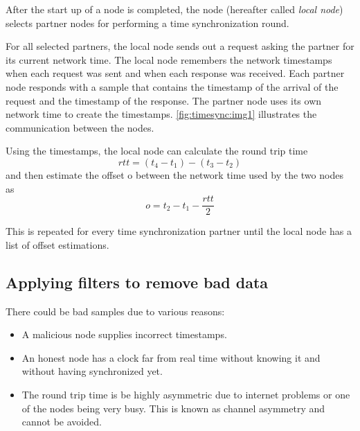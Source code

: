 After the start up of a node is completed, the node (hereafter called \emph{local node}) selects partner nodes for performing a time synchronization round.

For all selected partners, the local node sends out a request asking the partner for its current network time.
The local node remembers the network timestamps when each request was sent and when each response was received.
Each partner node responds with a sample that contains the timestamp of the arrival of the request and the timestamp of the response.
The partner node uses its own network time to create the timestamps.
\autoref{fig:timesync:img1} illustrates the communication between the nodes.

\begin{figure}
\end{figure}

Using the timestamps, the local node can calculate the round trip time
$$\textit{rtt}=(t_4-t_1)-(t_3-t_2)$$
and then estimate the offset o between the network time used by the two nodes as
$$o = t_2-t_1-\frac{rtt}{2}$$

This is repeated for every time synchronization partner until the local node has a list of offset estimations.

\subsection{Applying filters to remove bad data}

There could be bad samples due to various reasons:
\begin{itemize}
\item A malicious node supplies incorrect timestamps.
\item An honest node has a clock far from real time without knowing it and without having synchronized yet.
\item The round trip time is be highly asymmetric due to internet problems or one of the nodes being very busy.
This is known as channel asymmetry and cannot be avoided.
\end{itemize}

